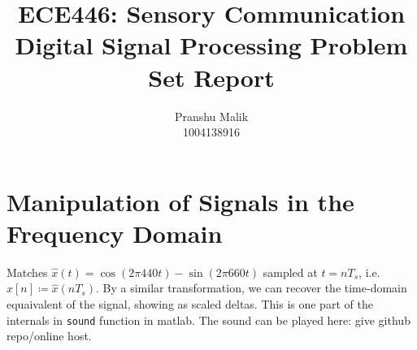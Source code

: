 \documentclass[10pt]{article}
\date{}
\begin{document}
\title{\textbf{\Large{\textsc{ECE446:} Sensory Communication}} \\ \Large{Digital Signal Processing Problem Set Report}\vspace{-0.3cm}}
\author{Pranshu Malik\\ \footnotesize{1004138916}\vspace{-3cm}}

\maketitle

\section{Manipulation of Signals in the Frequency Domain}
Matches $\hat{x}(t) = \cos(2\pi440t) - \sin(2\pi660t)$ sampled at $t = nT_s$, i.e. $\hat{x}[n] \coloneqq \hat{x}(nT_s)$. By a similar transformation, we can recover the time-domain equaivalent of the signal, showing as scaled deltas. This is one part of the internals in \texttt{sound} function in matlab. The sound can be played here: give github repo/online host.
\end{document}
